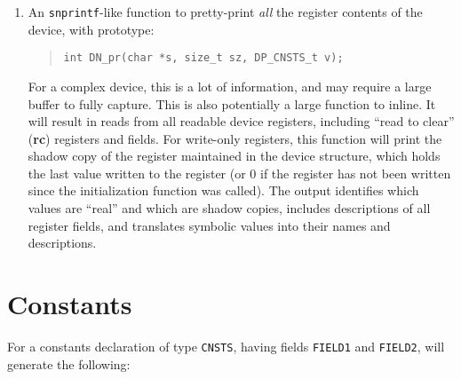\documentclass[a4paper,11pt,twoside]{report}
\begin{document}
\begin{enumerate}
\item An \texttt{snprintf}-like function to
  pretty-print \emph{all} the register contents of the device, with prototype:
  \begin{quote}
    \texttt{int DN\_pr(char *s, size\_t sz, DP\_CNSTS\_t v);}
  \end{quote}
  For a complex device, this is a lot of information, and may require a
  large buffer to fully capture.  This is also potentially a large
  function to inline.  It will result in reads from all readable device
  registers, including ``read to clear'' (\textbf{rc}) registers and
  fields.  For write-only registers, this function will print the shadow
  copy of the register maintained in the device structure, which holds
  the last value written to the register (or 0 if the register has not
  been written since the initialization function was called).  The
  output identifies which values are ``real'' and which are shadow
  copies, includes descriptions of all register fields, and translates
  symbolic values into their names and descriptions. 
\end{enumerate}

\section{Constants}

For a constants declaration of type \texttt{CNSTS}, having fields
\texttt{FIELD1} and \texttt{FIELD2}, \Mac will generate the following:
\end{document}
